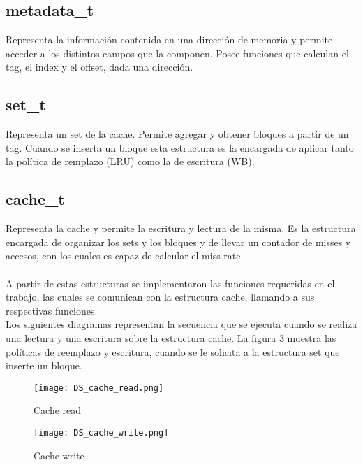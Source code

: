 \documentclass[a4paper,10pt]{article}
\begin{document}
    \subsection{metadata\_t}
        Representa la información contenida en una dirección de memoria y permite acceder a los distintos campos que la componen. Posee funciones que calculan el tag, el index y el offset, dada una dirección.\\
        
    \subsection{set\_t}
        Representa un set de la cache. Permite agregar y obtener bloques a partir de un tag. Cuando se inserta un bloque esta estructura es la encargada de aplicar tanto la política de remplazo (LRU) como la de escritura (WB).\\
        
    \subsection{cache\_t}
        Representa la cache y permite la escritura y lectura de la misma. Es la estructura encargada de organizar los sets y los bloques y de llevar un contador de misses y accesos, con los cuales es capaz de calcular el miss rate.\\\\
    
    A partir de estas estructuras se implementaron las funciones requeridas en el trabajo, las cuales se comunican con la estructura cache, llamando a sus respectivas funciones.\\
    
    Los siguientes diagramas representan la secuencia que se ejecuta cuando se realiza una lectura y una escritura sobre la estructura cache. La figura 3 muestra las políticas de reemplazo y escritura, cuando se le solicita a la estructura set que inserte un bloque.
    
    \begin{figure}[H]
        \centering
        \texttt{[image: DS\_cache\_read.png]}
        \caption{Cache read}
        \label{fig:my_label}
    \end{figure}
    
     \begin{figure}[H]
        \centering
        \texttt{[image: DS\_cache\_write.png]}
        \caption{Cache write}
        \label{fig:my_label}
    \end{figure}
    
\end{document}
